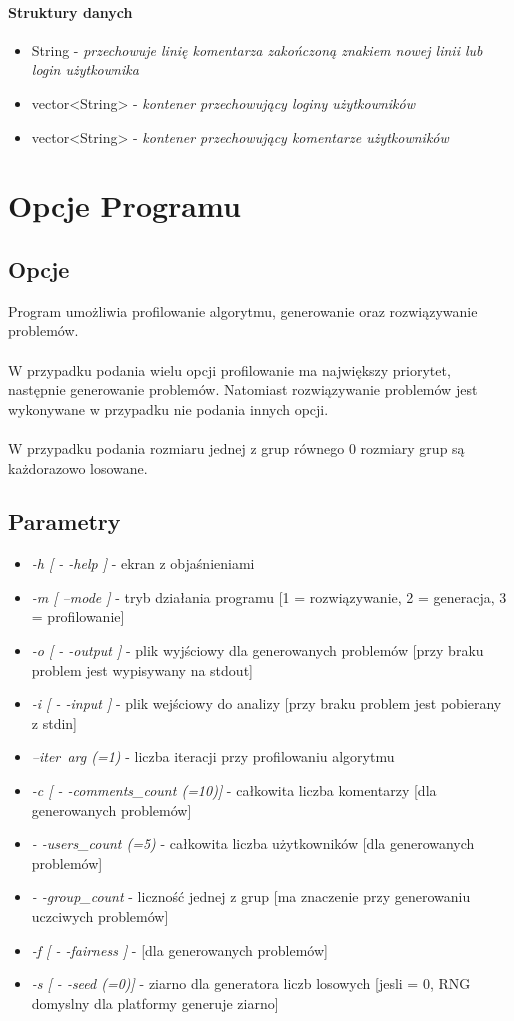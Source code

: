 \documentclass[11pt]{article}
\newcommand{\+}{\discretionary{\mbox{\scriptsize$\hookleftarrow$}}{}{}}
\begin{document}
\paragraph{Struktury danych}
\begin{itemize}
	\item 
  String - \textsl{przechowuje linię komentarza zakończoną znakiem nowej linii lub login użytkownika}
 	\item
  vector<String> - \textsl{kontener przechowujący loginy użytkowników}
  	\item 
  vector<String> - \textsl{kontener przechowujący komentarze użytkowników}

\end{itemize}
\section{Opcje Programu}
\subsection{Opcje}
Program umożliwia profilowanie algorytmu, generowanie oraz rozwiązywanie problemów.
\\\\
W przypadku podania wielu opcji profilowanie ma największy priorytet, następnie generowanie problemów. Natomiast rozwiązywanie problemów jest wykonywane w przypadku nie podania innych opcji.
\\\\
W przypadku podania rozmiaru jednej z grup równego 0 rozmiary grup są każdorazowo losowane.
\subsection{Parametry}
\begin{itemize} 
\item
\textit{-h [ - -help ]} - ekran z objaśnieniami
\item
\textit{-m [ --mode ]} - tryb działania programu [1 = rozwiązywanie, 2 = generacja, 3 = profilowanie]
\item
\textit{-o [ - -output ]} - plik wyjściowy dla generowanych problemów [przy braku problem jest wypisywany na stdout]
\item
\textit{-i [ - -input ] } - plik wejściowy do analizy [przy braku problem jest pobierany z stdin]  
\item
\textit{--iter\ arg (=1)} - liczba iteracji przy profilowaniu algorytmu
\item
\textit{-c [ - -comments\_count (=10)]} - całkowita liczba komentarzy [dla generowanych problemów]
\item
\textit{- -users\_count (=5) } - całkowita liczba użytkowników [dla generowanych problemów]
\item
\textit{- -group\_count} - liczność jednej z grup [ma znaczenie przy generowaniu uczciwych problemów]
\item
\textit{-f [ - -fairness ]} - [dla generowanych problemów]
\item 
\textit{-s [ - -seed (=0)]} - ziarno dla generatora liczb losowych [jesli = 0, RNG domyslny dla platformy generuje ziarno]
\end{itemize}
\end{document}
